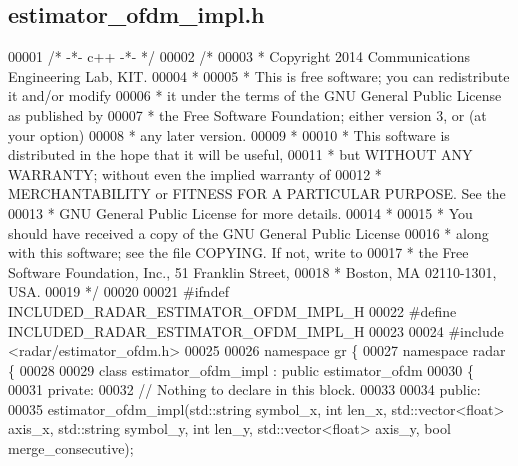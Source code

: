 \subsection{estimator\+\_\+ofdm\+\_\+impl.\+h}
\label{estimator__ofdm__impl_8h_source}

\begin{DoxyCode}
00001 \textcolor{comment}{/* -*- c++ -*- */}
00002 \textcolor{comment}{/* }
00003 \textcolor{comment}{ * Copyright 2014 Communications Engineering Lab, KIT.}
00004 \textcolor{comment}{ * }
00005 \textcolor{comment}{ * This is free software; you can redistribute it and/or modify}
00006 \textcolor{comment}{ * it under the terms of the GNU General Public License as published by}
00007 \textcolor{comment}{ * the Free Software Foundation; either version 3, or (at your option)}
00008 \textcolor{comment}{ * any later version.}
00009 \textcolor{comment}{ * }
00010 \textcolor{comment}{ * This software is distributed in the hope that it will be useful,}
00011 \textcolor{comment}{ * but WITHOUT ANY WARRANTY; without even the implied warranty of}
00012 \textcolor{comment}{ * MERCHANTABILITY or FITNESS FOR A PARTICULAR PURPOSE.  See the}
00013 \textcolor{comment}{ * GNU General Public License for more details.}
00014 \textcolor{comment}{ * }
00015 \textcolor{comment}{ * You should have received a copy of the GNU General Public License}
00016 \textcolor{comment}{ * along with this software; see the file COPYING.  If not, write to}
00017 \textcolor{comment}{ * the Free Software Foundation, Inc., 51 Franklin Street,}
00018 \textcolor{comment}{ * Boston, MA 02110-1301, USA.}
00019 \textcolor{comment}{ */}
00020 
00021 \textcolor{preprocessor}{#ifndef INCLUDED\_RADAR\_ESTIMATOR\_OFDM\_IMPL\_H}
00022 \textcolor{preprocessor}{#define INCLUDED\_RADAR\_ESTIMATOR\_OFDM\_IMPL\_H}
00023 
00024 \textcolor{preprocessor}{#include <radar/estimator_ofdm.h>}
00025 
00026 \textcolor{keyword}{namespace }gr \{
00027   \textcolor{keyword}{namespace }radar \{
00028 
00029     \textcolor{keyword}{class }estimator_ofdm_impl : \textcolor{keyword}{public} estimator_ofdm
00030     \{
00031      \textcolor{keyword}{private}:
00032       \textcolor{comment}{// Nothing to declare in this block.}
00033 
00034      \textcolor{keyword}{public}:
00035       estimator_ofdm_impl(std::string symbol\_x, \textcolor{keywordtype}{int} len\_x, std::vector<float> axis\_x, 
      std::string symbol\_y, \textcolor{keywordtype}{int} len\_y, std::vector<float> axis\_y, \textcolor{keywordtype}{bool} merge\_consecutive);

\end{DoxyCode}
